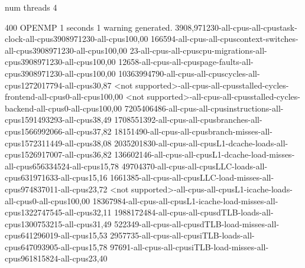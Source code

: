 num threads 4

400
OPENMP
1 seconds
1 warning generated.
3908,971230-all-cpus-all-cpustask-clock-all-cpus3908971230-all-cpus100,00
166594-all-cpus-all-cpuscontext-switches-all-cpus3908971230-all-cpus100,00
23-all-cpus-all-cpuscpu-migrations-all-cpus3908971230-all-cpus100,00
12658-all-cpus-all-cpuspage-faults-all-cpus3908971230-all-cpus100,00
10363994790-all-cpus-all-cpuscycles-all-cpus1272017794-all-cpus30,87
<not supported>-all-cpus-all-cpusstalled-cycles-frontend-all-cpus0-all-cpus100,00
<not supported>-all-cpus-all-cpusstalled-cycles-backend-all-cpus0-all-cpus100,00
7205406486-all-cpus-all-cpusinstructions-all-cpus1591493293-all-cpus38,49
1708551392-all-cpus-all-cpusbranches-all-cpus1566992066-all-cpus37,82
18151490-all-cpus-all-cpusbranch-misses-all-cpus1572311449-all-cpus38,08
2035201830-all-cpus-all-cpusL1-dcache-loads-all-cpus1526917007-all-cpus36,82
136602146-all-cpus-all-cpusL1-dcache-load-misses-all-cpus656334524-all-cpus15,78
49704370-all-cpus-all-cpusLLC-loads-all-cpus631971633-all-cpus15,16
1661385-all-cpus-all-cpusLLC-load-misses-all-cpus974837011-all-cpus23,72
<not supported>-all-cpus-all-cpusL1-icache-loads-all-cpus0-all-cpus100,00
18367984-all-cpus-all-cpusL1-icache-load-misses-all-cpus1322747545-all-cpus32,11
1988172484-all-cpus-all-cpusdTLB-loads-all-cpus1300753215-all-cpus31,49
522349-all-cpus-all-cpusdTLB-load-misses-all-cpus641296019-all-cpus15,53
2957735-all-cpus-all-cpusiTLB-loads-all-cpus647093905-all-cpus15,78
97691-all-cpus-all-cpusiTLB-load-misses-all-cpus961815824-all-cpus23,40
